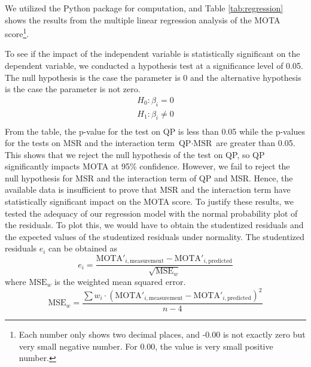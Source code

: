 \setcounter{footnote}{1} %
We utilized the Python package \cite{seabold_statsmodels_2010} for computation, and Table \ref{tab:regression} shows the results from the multiple linear regression analysis of the MOTA score\footnote{Each number only shows two decimal places, and -0.00 is not exactly zero but very small negative number. For 0.00, the value is very small positive number.}.

To see if the impact of the independent variable is statistically significant on the dependent variable, we conducted a hypothesis test at a significance level of 0.05. The null hypothesis is the case the parameter is 0 and the alternative hypothesis is the case the parameter is not zero.
\begin{equation}
    \begin{aligned}
        H_0: \beta_i = 0 \\
        H_1: \beta_i \neq 0 \\
    \end{aligned}
\end{equation}
From the table, the p-value for the test on QP is less than 0.05 while the p-values for the tests on MSR and the interaction term $\text{QP} \cdot \text{MSR}$ are greater than 0.05. This shows that we reject the null hypothesis of the test on QP, so QP significantly impacts MOTA at 95\% confidence. However, we fail to reject the null hypothesis for MSR and the interaction term of QP and MSR. Hence, the available data is insufficient to prove that MSR and the interaction term have statistically significant impact on the MOTA score. To justify these results, we tested the adequacy of our regression model with the normal probability plot of the residuals. To plot this, we would have to obtain the studentized residuals and the expected values of the studentized residuals under normality. The studentized residuals $e_i$ can be obtained as
\begin{equation}
    e_i = \frac{ \text{MOTA}'_{i,\text{measurement}} - \text{MOTA}'_{i,\text{predicted}} }{\sqrt{\text{MSE}_w}}
    \label{eqn:residuals}
\end{equation}
where $\text{MSE}_w$ is the weighted mean squared error.
\begin{equation}
    \text{MSE}_w = \frac{\sum w_i \cdot ( \text{MOTA}'_{i,\text{measurement}} - \text{MOTA}'_{i,\text{predicted}} )^2 }{n-4}
\end{equation}
